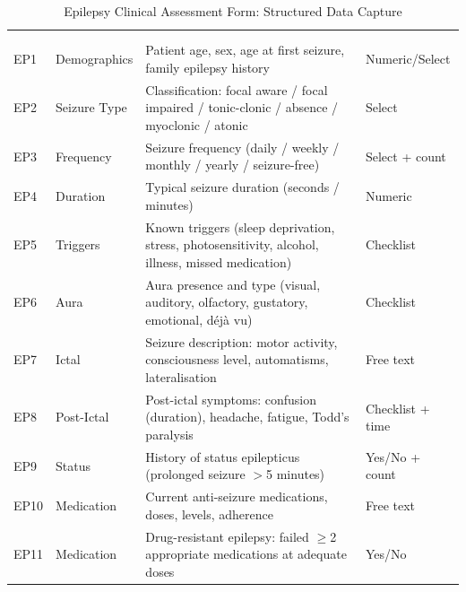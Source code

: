 {\tablestripes\tablefontsize
\begin{xltabular}{\textwidth}{@{} >{\raggedright\arraybackslash}p{0.5cm} >{\raggedright\arraybackslash}p{2.0cm} L p{1.4cm} @{}}
\caption{Epilepsy Clinical Assessment Form: Structured Data Capture}\label{app_tab:epilepsy_form} \\
\toprule
\thead{\#} &  &  &  \\
\midrule
\endfirsthead
{} \\
\toprule
\thead{\#} &  &  &  \\
\midrule
\endhead
\bottomrule
\endlastfoot
EP1 & Demographics & Patient age, sex, age at first seizure, family epilepsy history & Numeric/Select \\
\addlinespace
EP2 & Seizure Type & Classification: focal aware / focal impaired / tonic-clonic / absence / myoclonic / atonic & Select \\
\addlinespace
EP3 & Frequency & Seizure frequency (daily / weekly / monthly / yearly / seizure-free) & Select + count \\
\addlinespace
EP4 & Duration & Typical seizure duration (seconds / minutes) & Numeric \\
\addlinespace
EP5 & Triggers & Known triggers (sleep deprivation, stress, photosensitivity, alcohol, illness, missed medication) & Checklist \\
\addlinespace
EP6 & Aura & Aura presence and type (visual, auditory, olfactory, gustatory, emotional, d\'ej\`a vu) & Checklist \\
\addlinespace
EP7 & Ictal & Seizure description: motor activity, consciousness level, automatisms, lateralisation & Free text \\
\addlinespace
EP8 & Post-Ictal & Post-ictal symptoms: confusion (duration), headache, fatigue, Todd's paralysis & Checklist + time \\
\addlinespace
EP9 & Status & History of status epilepticus (prolonged seizure $>$5 minutes) & Yes/No + count \\
\addlinespace
EP10 & Medication & Current anti-seizure medications, doses, levels, adherence & Free text \\
\addlinespace
EP11 & Medication & Drug-resistant epilepsy: failed $\geq$2 appropriate medications at adequate doses & Yes/No \\

\end{xltabular}}

